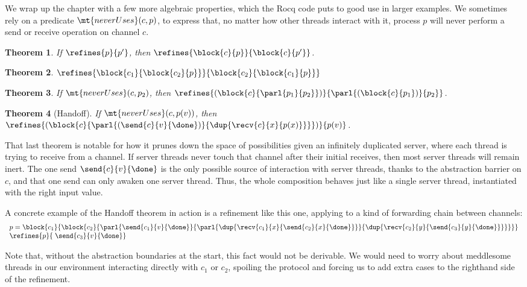 \documentclass{amsbook}
\newtheorem{theorem}{Theorem}[chapter]
\theoremstyle{definition}
\theoremstyle{remark}
\numberwithin{section}{chapter}
\numberwithin{equation}{chapter}
\begin{document}
\newcommand{\neverUses}[2]{\mt{neverUses}(#1, #2)}

We wrap up the chapter with a few more algebraic properties, which the Rocq code puts to good use in larger examples.
We sometimes rely on a predicate $\neverUses{c}{p}$, to express that, no matter how other threads interact with it, process $p$ will never perform a send or receive operation on channel $c$.

\begin{theorem}
  If $\refines{p}{p'}$, then $\refines{\block{c}{p}}{\block{c}{p'}}$.
\end{theorem}

\begin{theorem}
  $\refines{\block{c_1}{\block{c_2}{p}}}{\block{c_2}{\block{c_1}{p}}}$
\end{theorem}

\begin{theorem}
  If $\neverUses{c}{p_2}$, then $\refines{(\block{c}{\parl{p_1}{p_2}})}{\parl{(\block{c}{p_1})}{p_2}}$.
\end{theorem}

\begin{theorem}[Handoff]
  If $\neverUses{c}{p(v)}$, then $\refines{(\block{c}{\parl{(\send{c}{v}{\done})}{\dup{\recv{c}{x}{p(x)}}}})}{p(v)}$.
\end{theorem}

That last theorem is notable for how it prunes down the space of possibilities given an infinitely duplicated server, where each thread is trying to receive from a channel.
If server threads never touch that channel after their initial receives, then most server threads will remain inert.
The one send $\send{c}{v}{\done}$ is the only possible source of interaction with server threads, thanks to the abstraction barrier on $c$, and that one send can only awaken one server thread.
Thus, the whole composition behaves just like a single server thread, instantiated with the right input value.

A concrete example of the Handoff theorem in action is a refinement like this one, applying to a kind of forwarding chain between channels:
$$\begin{array}{l}
  p = \block{c_1}{\block{c_2}{\parl{\send{c_1}{v}{\done}}{\parl{\dup{\recv{c_1}{x}{\send{c_2}{x}{\done}}}}{\dup{\recv{c_2}{y}{\send{c_3}{y}{\done}}}}}}} \\
  \refines{p}{\; \send{c_3}{v}{\done}}
\end{array}$$

Note that, without the abstraction boundaries at the start, this fact would not be derivable.
We would need to worry about meddlesome threads in our environment interacting directly with $c_1$ or $c_2$, spoiling the protocol and forcing us to add extra cases to the righthand side of the refinement.
\end{document}

